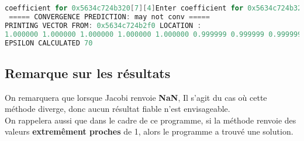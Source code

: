 \documentclass{report}
\begin{document}
\begin{lstlisting}[language=C,inputencoding=utf8, basicstyle=\fontsize{8}{10}\selectfont,caption=Execution with A6 dimensions: 10x10]
coefficient for 0x5634c724b320[7][4]Enter coefficient for 0x5634c724b320[7][5]Enter coefficient for 0x5634c724b320[7][6]Enter coefficient for 0x5634c724b320[7][7]Enter coefficient for 0x5634c724b320[7][8]Enter coefficient for 0x5634c724b320[7][9]Enter coefficient for 0x5634c724b320[8][0]Enter coefficient for 0x5634c724b320[8][1]Enter coefficient for 0x5634c724b320[8][2]Enter coefficient for 0x5634c724b320[8][3]Enter coefficient for 0x5634c724b320[8][4]Enter coefficient for 0x5634c724b320[8][5]Enter coefficient for 0x5634c724b320[8][6]Enter coefficient for 0x5634c724b320[8][7]Enter coefficient for 0x5634c724b320[8][8]Enter coefficient for 0x5634c724b320[8][9]Enter coefficient for 0x5634c724b320[9][0]Enter coefficient for 0x5634c724b320[9][1]Enter coefficient for 0x5634c724b320[9][2]Enter coefficient for 0x5634c724b320[9][3]Enter coefficient for 0x5634c724b320[9][4]Enter coefficient for 0x5634c724b320[9][5]Enter coefficient for 0x5634c724b320[9][6]Enter coefficient for 0x5634c724b320[9][7]Enter coefficient for 0x5634c724b320[9][8]Enter coefficient for 0x5634c724b320[9][9]
 ===== CONVERGENCE PREDICTION: may not conv =====
PRINTING VECTOR FROM: 0x5634c724b2f0 LOCATION :
1.000000 1.000000 1.000000 1.000000 1.000000 0.999999 0.999999 0.999999 0.999999 1.000000
EPSILON CALCULATED 70
\end{lstlisting}
\subsection{Remarque sur les résultats}
On remarquera que lorsque Jacobi renvoie \textbf{NaN}, Il s'agit du cas où cette méthode diverge, donc aucun résultat fiable n'est envisageable.\\
On rappelera aussi que dans le cadre de ce programme, si la méthode renvoie des valeurs \textbf{extremêment proches} de 1, alors le programme a trouvé une solution. 
\end{document}
